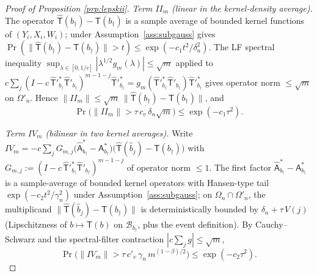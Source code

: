 \begin{proof}[Proof of Proposition \ref{prp:lepskii}]
\emph{Term $II_m$ (linear in the kernel-density average).} The operator
$\hat{\mathsf T}(b_\dagger) - \mathsf T(b_\dagger)$ is a sample average of
bounded kernel functions of $(Y_i, X_i, W_i)$; \citet[Theorem~6]{hansen2008} %
under Assumption~\ref{ass:subgauss} gives
$\Pr(\|\hat{\mathsf T}(b_\dagger) - \mathsf T(b_\dagger)\| > t) \le
\exp(-c_1 t^2/\delta_n^2)$. The LF spectral inequality
$\sup_{\lambda \in [0,1/c]}|\lambda^{1/2}g_m(\lambda)| \le \sqrt m$
\citep[Eq.~6.5]{engl2000} applied to
$c\sum_j(I - c\,\hat{\mathsf T}'^{*}_{b_\dagger}\hat{\mathsf T}'_{b_\dagger})^{m-1-j}\hat{\mathsf T}'^{*}_{b_\dagger}
= g_m(\hat{\mathsf T}'^{*}_{b_\dagger}\hat{\mathsf T}'_{b_\dagger})\hat{\mathsf T}'^{*}_{b_\dagger}$
gives operator norm $\le \sqrt m$ on $\Omega'_n$. Hence
$\|II_m\| \le \sqrt m\,\|\hat{\mathsf T}(b_\dagger) - \mathsf T(b_\dagger)\|$,
and
\begin{equation}\label{eq:II-tail}
\Pr\!\bigl(\|II_m\| > \tau\,c_v\,\delta_n\sqrt m\bigr) \le \exp(-c_1\tau^2).
\end{equation}

\emph{Term $IV_m$ (bilinear in two kernel averages).} Write
$IV_m = -c\sum_j G_{m,j}\bigl(\hat{\mathsf A}^{*}_{b_\dagger} - \mathsf A^{*}_{b_\dagger}\bigr)
\bigl(\hat{\mathsf T}(\hat b_j) - \mathsf T(b_\dagger)\bigr)$ with
$G_{m,j} := (I - c\,\hat{\mathsf T}'^{*}_{b_\dagger}\hat{\mathsf T}'_{b_\dagger})^{m-1-j}$
of operator norm $\le 1$. The first factor
$\hat{\mathsf A}^{*}_{b_\dagger} - \mathsf A^{*}_{b_\dagger}$ is a
sample-average of bounded kernel operators with Hansen-type tail
$\exp(-c_2 t^2/\gamma_n^2)$ under Assumption~\ref{ass:subgauss}; on
$\Omega_n \cap \Omega'_n$, the multiplicand
$\|\hat{\mathsf T}(\hat b_j) - \mathsf T(b_\dagger)\|$ is deterministically
bounded by $\delta_n + \tau\,V(j)$ (Lipschitzness of
$b \mapsto \mathsf T(b)$ on $\mathcal B_{b_\dagger}$, plus the event
definition). By Cauchy--Schwarz and the spectral-filter contraction
$|c\sum_j g| \le \sqrt m$,
\begin{equation}\label{eq:IV-tail}
\Pr\!\bigl(\|IV_m\| > \tau\,c'_v\,\gamma_n\,m^{(1-\beta)/2}\bigr)
\le \exp(-c_2\tau^2).
\end{equation}


\end{proof}
